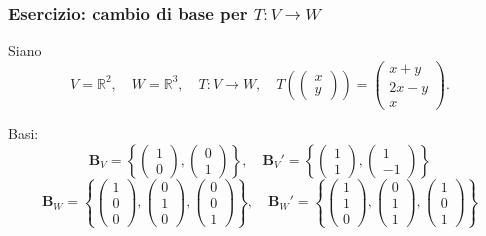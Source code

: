 \documentclass[12pt,a4paper]{article}
\begin{document}
\subsubsection*{Esercizio: cambio di base per \( T : V \to W \)}

Siano
\[
V = \mathbb{R}^2, \quad W = \mathbb{R}^3,
\quad
T : V \to W, \quad
T\left(\begin{pmatrix} x \\ y \end{pmatrix}\right) = \begin{pmatrix} x + y \\ 2x - y \\ x \end{pmatrix}.
\]

Basi:
\[
\bm{B}_V = \left\{ \begin{pmatrix} 1 \\ 0 \end{pmatrix}, \begin{pmatrix} 0 \\ 1 \end{pmatrix} \right\}, \quad
\bm{B}_V' = \left\{ \begin{pmatrix} 1 \\ 1 \end{pmatrix}, \begin{pmatrix} 1 \\ -1 \end{pmatrix} \right\}
\]
\[
\bm{B}_W = \left\{ \begin{pmatrix} 1 \\ 0 \\ 0 \end{pmatrix}, \begin{pmatrix} 0 \\ 1 \\ 0 \end{pmatrix}, \begin{pmatrix} 0 \\ 0 \\ 1 \end{pmatrix} \right\}, \quad
\bm{B}_W' = \left\{ \begin{pmatrix} 1 \\ 1 \\ 0 \end{pmatrix}, \begin{pmatrix} 0 \\ 1 \\ 1 \end{pmatrix}, \begin{pmatrix} 1 \\ 0 \\ 1 \end{pmatrix} \right\}
\]
\end{document}
